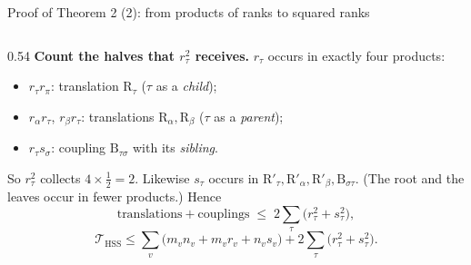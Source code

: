 \documentclass[aspectratio=169,11pt]{beamer}
\begin{document}
\begin{frame}{Proof of Theorem 2 (2): from products of ranks to squared ranks}
\begin{columns}[c]
\begin{column}{0.54\textwidth}
\vspace{1mm}
\textbf{Count the halves that $r_\tau^2$ receives.} $r_\tau$ occurs in exactly four products:
\begin{itemize}
\item $r_\tau r_\pi$: translation $\mathrm{R}_\tau$ ($\tau$ as a \emph{child});
\item $r_\alpha r_\tau$, $r_\beta r_\tau$: translations $\mathrm{R}_\alpha,\mathrm{R}_\beta$ ($\tau$ as a \emph{parent});
\item $r_\tau s_\sigma$: coupling $\mathrm{B}_{\tau\sigma}$ with its \emph{sibling}.
\end{itemize}
So $r_\tau^2$ collects $4\times\frac12=2$. Likewise $s_\tau$ occurs in $\mathrm{R}'_\tau,\mathrm{R}'_\alpha,
\mathrm{R}'_\beta,\mathrm{B}_{\sigma\tau}$. (The root and the leaves occur in fewer products.) Hence
\[
\text{translations}+\text{couplings}\;\leq\;2\textstyle\sum_\tau\big(r_\tau^2+s_\tau^2\big),
\]
\[
\mathcal{T}_{\mathrm{HSS}}\leq\textstyle\sum_v\big(m_vn_v+m_vr_v+n_vs_v\big)+2\sum_\tau\big(r_\tau^2+s_\tau^2\big).
\]
\end{column}
\end{columns}
\end{frame}
\end{document}
